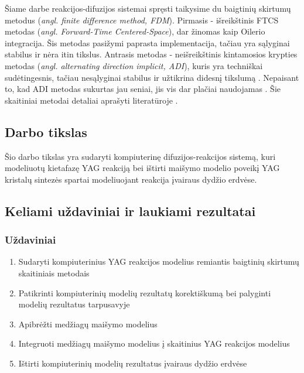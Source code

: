 \documentclass[]{VUMIFTemplateClass}
\begin{document}
Šiame darbe reakcijos-difuzijos sistemai spręsti taikysime du baigtinių skirtumų metodus (\textit{angl. finite difference method, FDM}). Pirmasis - išreikštinis FTCS metodas (\textit{angl. Forward-Time Centered-Space}), dar žinomas kaip Oilerio integracija. Šis metodas pasižymi paprasta implementacija, tačiau yra sąlyginai stabilus ir nėra itin tikslus. Antrasis metodas - neišreikštinis kintamosios krypties metodas (\textit{angl. alternating direction implicit, ADI}), kuris yra techniškai sudėtingesnis, tačiau nesąlyginai stabilus ir užtikrina didesnį tikslumą \cite{doi:10.1137/0103003}. Nepaisant to, kad ADI metodas sukurtas jau seniai, jis vis dar plačiai naudojamas \cite{gaidamauskaiteComparisonFiniteDifference2007}. Šie skaitiniai metodai detaliai aprašyti literatūroje \cite{pressNumericalRecipes3rd2007,levequeFiniteDifferenceMethods2007}. 


\subsection{Darbo tikslas}

Šio darbo tikslas yra sudaryti kompiuterinę difuzijos-reakcijos sistemą, kuri modeliuotų kietafazę YAG reakciją bei ištirti maišymo modelio poveikį YAG kristalų sintezės spartai modeliuojant reakcija įvairaus dydžio erdvėse.

\subsection{Keliami uždaviniai ir laukiami rezultatai}
\subsubsection{Uždaviniai}
\begin{enumerate}
  
    \item Sudaryti kompiuterinius YAG reakcijos modelius remiantis baigtinių skirtumų skaitiniais metodais
    \item Patikrinti kompiuterinių modelių rezultatų korektiškumą bei palyginti modelių rezultatus tarpusavyje
    \item Apibrėžti medžiagų maišymo modelius
    \item Integruoti medžiagų maišymo modelius į skaitinius YAG reakcijos modelius
    \item Ištirti kompiuterinių modelių rezultatus įvairaus dydžio erdvėse
\end{enumerate}
\end{document}

